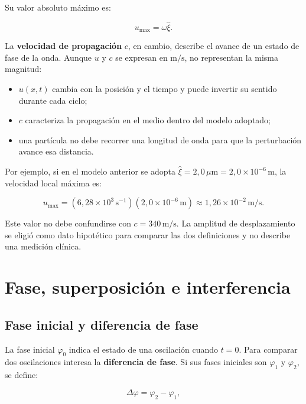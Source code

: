 Su valor absoluto máximo es:

\begin{equation}
    u_{\max}=\omega\hat{\xi}.
    \label{eq:u3-velocidad-particula-max}
\end{equation}

La \textbf{velocidad de propagación} \(c\), en cambio, describe el avance de un
estado de fase de la onda. Aunque \(u\) y \(c\) se expresan en
\(\text{m}/\text{s}\), no representan la misma magnitud:

\begin{itemize}
    \item \(u(x,t)\) cambia con la posición y el tiempo y puede invertir su
    sentido durante cada ciclo;
    \item \(c\) caracteriza la propagación en el medio dentro del modelo
    adoptado;
    \item una partícula no debe recorrer una longitud de onda para que la
    perturbación avance esa distancia.
\end{itemize}

Por ejemplo, si en el modelo anterior se adopta
\(\hat{\xi}=2{,}0\,\mu\text{m}=2{,}0\times10^{-6}\,\text{m}\), la velocidad
local máxima es:

\[
    u_{\max}
      =(6{,}28\times10^{3}\,\text{s}^{-1})
       (2{,}0\times10^{-6}\,\text{m})
      \approx1{,}26\times10^{-2}\,\text{m}/\text{s}.
\]

Este valor no debe confundirse con
\(c=340\,\text{m}/\text{s}\). La amplitud de desplazamiento se eligió como
dato hipotético para comparar las dos definiciones y no describe una
medición clínica.

\section{Fase, superposición e interferencia}
\label{sec:u3-superposicion}

\subsection{Fase inicial y diferencia de fase}
\label{sec:u3-diferencia-fase}

La fase inicial \(\varphi_0\) indica el estado de una oscilación cuando
\(t=0\). Para comparar dos oscilaciones interesa la
\textbf{diferencia de fase}. Si sus fases iniciales son
\(\varphi_1\) y \(\varphi_2\), se define:

\begin{equation}
    \Delta\varphi=\varphi_2-\varphi_1,
    \label{eq:u3-diferencia-fase}
\end{equation}

